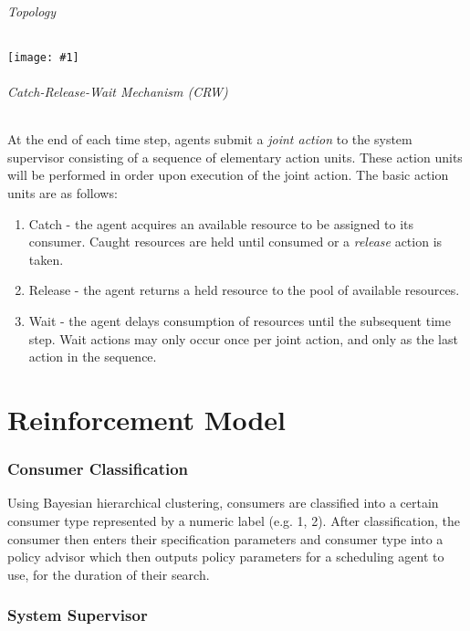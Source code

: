 \documentclass{article}
\theoremstyle{definition}
\theoremstyle{remark}
\newcommand{\addpic}[1]{\texttt{[image: \#1]}}
\begin{document}
				\paragraph{Topology}
				
				\addpic{figures/Neural-Network.jpeg}

	
	\paragraph{Catch-Release-Wait Mechanism (CRW)}
	
	At the end of each time step, agents submit a \emph{joint action} to the system supervisor consisting of a sequence of elementary action units. These action units will be performed in order upon execution of the joint action. The basic action units are as follows:
	
	\begin{enumerate}
		\item Catch - the agent acquires an available resource to be assigned to its consumer. Caught resources are held until consumed or a \emph{release} action is taken.
		\item Release - the agent returns a held resource to the pool of available resources.
		\item Wait - the agent delays consumption of resources until the subsequent time step. Wait actions may only occur once per joint action, and only as the last action in the sequence.
	\end{enumerate}

	
	\newpage
	
\part{Reinforcement Model}

	\section{Consumer Classification}
	Using Bayesian hierarchical clustering, consumers are classified into a certain consumer type represented by a
    numeric label (e.g. 1, 2). After classification, the consumer then enters their specification parameters and
    consumer type into a policy advisor which then outputs policy parameters for a scheduling agent to use, for
    the duration of their search.
	

	\section{System Supervisor}
	
\end{document}
